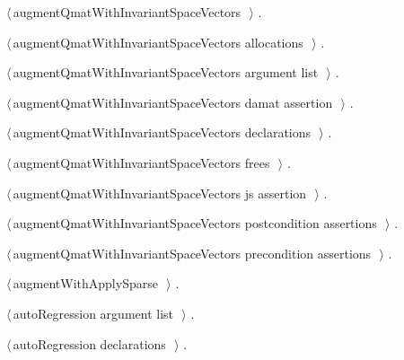 \documentclass{article}
\begin{document}
{\begin{list}{}{\setlength{\itemsep}{-\parsep}\setlength{\itemindent}{-\leftmargin}}
\item $\langle\,$augmentQmatWithInvariantSpaceVectors\nobreak\ {\footnotesize {}}$\,\rangle$ {\footnotesize {\NWtxtRefIn} .}
\item $\langle\,$augmentQmatWithInvariantSpaceVectors allocations\nobreak\ {\footnotesize {}}$\,\rangle$ {\footnotesize {\NWtxtRefIn} .}
\item $\langle\,$augmentQmatWithInvariantSpaceVectors argument list\nobreak\ {\footnotesize {}}$\,\rangle$ {\footnotesize {\NWtxtRefIn} .
}
\item $\langle\,$augmentQmatWithInvariantSpaceVectors damat assertion\nobreak\ {\footnotesize {}}$\,\rangle$ {\footnotesize {\NWtxtRefIn} .}
\item $\langle\,$augmentQmatWithInvariantSpaceVectors declarations\nobreak\ {\footnotesize {}}$\,\rangle$ {\footnotesize {\NWtxtRefIn} .}
\item $\langle\,$augmentQmatWithInvariantSpaceVectors frees\nobreak\ {\footnotesize {}}$\,\rangle$ {\footnotesize {\NWtxtRefIn} .}
\item $\langle\,$augmentQmatWithInvariantSpaceVectors js assertion\nobreak\ {\footnotesize {}}$\,\rangle$ {\footnotesize {\NWtxtRefIn} .}
\item $\langle\,$augmentQmatWithInvariantSpaceVectors postcondition assertions\nobreak\ {\footnotesize {}}$\,\rangle$ {\footnotesize {\NWtxtRefIn} .}
\item $\langle\,$augmentQmatWithInvariantSpaceVectors precondition assertions\nobreak\ {\footnotesize {}}$\,\rangle$ {\footnotesize {\NWtxtRefIn} .}
\item $\langle\,$augmentWithApplySparse\nobreak\ {\footnotesize {}}$\,\rangle$ {\footnotesize {\NWtxtRefIn} .}
\item $\langle\,$autoRegression argument list\nobreak\ {\footnotesize {}}$\,\rangle$ {\footnotesize {\NWtxtRefIn} .}
\item $\langle\,$autoRegression declarations\nobreak\ {\footnotesize {}}$\,\rangle$ {\footnotesize {\NWtxtRefIn} .}

\end{list}}
\end{document}
